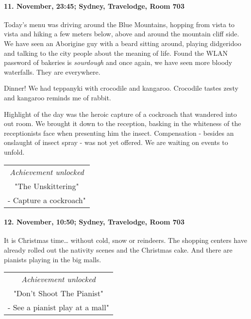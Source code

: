 \paragraph{11. November, 23:45; Sydney, Travelodge, Room 703}
Today's menu was driving around the Blue Mountains, hopping from vista to vista and hiking a few meters below, above and around the mountain cliff side.
We have seen an Aborigine guy with a beard sitting around, playing didgeridoo and talking to the city people about the meaning of life.
Found the WLAN password of bakeries is \emph{sourdough} and once again, we have seen more bloody waterfalls.
They are everywhere.

Dinner!
We had teppanyki with crocodile and kangaroo.
Crocodile tastes zesty and kangaroo reminds me of rabbit.

Highlight of the day was the heroic capture of a cockroach that wandered into out room.
We brought it down to the reception, basking in the whiteness of the receptionists face when presenting him the insect.
Compensation - besides an onslaught of insect spray - was not yet offered.
We are waiting on events to unfold.

\begin{center}
\begin{tabular}{||c||}
\emph{Achievement unlocked}\\
"The Unskittering"\\
\multicolumn{1}{||p{0.8\textwidth}||}{\footnotesize - Capture a cockroach"} \\
\end{tabular}
\end{center}

\paragraph{12. November, 10:50; Sydney, Travelodge, Room 703}
It is Christmas time\ldots{} without cold, snow or reindeers.
The shopping centers have already rolled out the nativity scenes and the Christmas cake.
And there are pianists playing in the big malls.

\begin{center}
\begin{tabular}{||c||}
\emph{Achievement unlocked}\\
"Don't Shoot The Pianist"\\
\multicolumn{1}{||p{0.8\textwidth}||}{\footnotesize - See a pianist play at a mall"} \\
\end{tabular}
\end{center}

